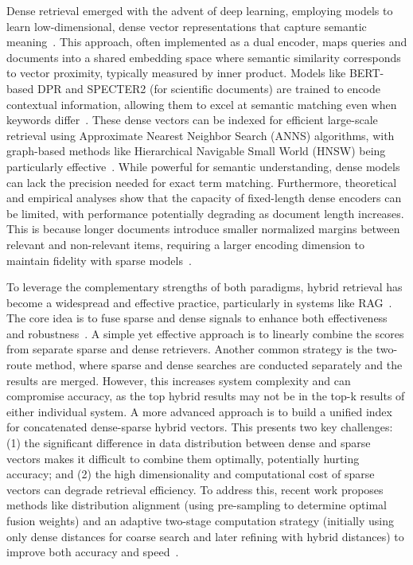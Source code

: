 Dense retrieval emerged with the advent of deep learning, employing models to learn low-dimensional, dense vector representations that capture semantic meaning~\cite{karpukhin2020dense}. This approach, often implemented as a dual encoder, maps queries and documents into a shared embedding space where semantic similarity corresponds to vector proximity, typically measured by inner product. Models like BERT-based DPR and SPECTER2 (for scientific documents) are trained to encode contextual information, allowing them to excel at semantic matching even when keywords differ~\cite{singh2022scirepeval}. These dense vectors can be indexed for efficient large-scale retrieval using Approximate Nearest Neighbor Search (ANNS) algorithms, with graph-based methods like Hierarchical Navigable Small World (HNSW) being particularly effective~\cite{malkov2016efficient}. While powerful for semantic understanding, dense models can lack the precision needed for exact term matching. Furthermore, theoretical and empirical analyses show that the capacity of fixed-length dense encoders can be limited, with performance potentially degrading as document length increases. This is because longer documents introduce smaller normalized margins between relevant and non-relevant items, requiring a larger encoding dimension to maintain fidelity with sparse models~\cite{formal2021splade}.

To leverage the complementary strengths of both paradigms, hybrid retrieval has become a widespread and effective practice, particularly in systems like RAG~\cite{lewis2020rag}. The core idea is to fuse sparse and dense signals to enhance both effectiveness and robustness~\cite{formal2021splade, karpukhin2020dense}. A simple yet effective approach is to linearly combine the scores from separate sparse and dense retrievers. Another common strategy is the two-route method, where sparse and dense searches are conducted separately and the results are merged. However, this increases system complexity and can compromise accuracy, as the top hybrid results may not be in the top-k results of either individual system. A more advanced approach is to build a unified index for concatenated dense-sparse hybrid vectors. This presents two key challenges: (1) the significant difference in data distribution between dense and sparse vectors makes it difficult to combine them optimally, potentially hurting accuracy; and (2) the high dimensionality and computational cost of sparse vectors can degrade retrieval efficiency. To address this, recent work proposes methods like distribution alignment (using pre-sampling to determine optimal fusion weights) and an adaptive two-stage computation strategy (initially using only dense distances for coarse search and later refining with hybrid distances) to improve both accuracy and speed~\cite{iida2022unsupervised}.

